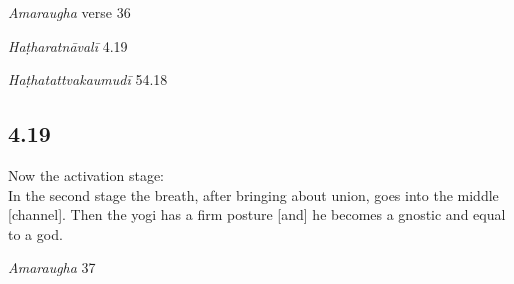 \begin{ekdosis}
\begin{sources}[hp04_018]
\emph{Amaraugha} verse 36
\begin{versinnote}
\end{versinnote}
\end{sources}

\begin{testimonia}[hp04_018]
\emph{Haṭharatnāvalī} 4.19
\begin{versinnote}
\end{versinnote}

\emph{Haṭhatattvakaumudī} 54.18
\begin{versinnote}
\end{versinnote}
\end{testimonia}


\subsection*{4.19}
\begin{translation}[hp04_019]
Now the activation stage:\\
In the second stage the breath, after bringing about union, goes into the middle [channel]. Then the yogi has a firm posture [and] he becomes a gnostic and equal to a god.
\end{translation}


\begin{sources}[hp04_019]
\emph{Amaraugha} 37
\begin{versinnote}
\tl{\var{dvitīye saṅ- ] $\beta$ : dvitīyāyāṃ $\theta$}\\!}
\end{versinnote}
\end{sources}


\end{ekdosis}
